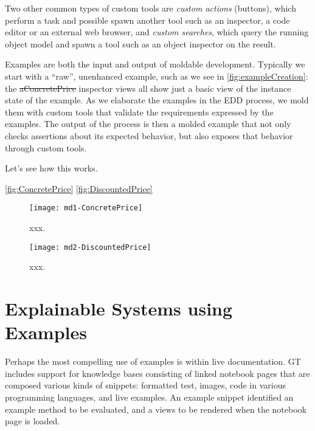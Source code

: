 \documentclass[sigplan,anonymous,review,10pt]{acmart}
\begin{document}
Two other common types of custom tools are \emph{custom actions} (\eg buttons), which perform a task and possible spawn another tool such as an inspector, a code editor or an external web browser, and \emph{custom searches}, which query the running object model and spawn a tool such as an object inspector on the result.

Examples are both the input and output of moldable development.
Typically we start with a ``raw'', unenhanced example, such as we see in \autoref{fig:exampleCreation}: the \st{aConcretePrice} inspector views all show just a basic view of the instance state of the example.
As we elaborate the examples in the EDD process, we mold them with custom tools that validate the requirements expressed by the examples.
The output of the process is then a molded example that not only checks assertions about its expected behavior, but also exposes that behavior through custom tools.

Let's see how this works.

\autoref{fig:ConcretePrice}
\autoref{fig:DiscountedPrice}


\begin{figure}[h]
  \texttt{[image: md1-ConcretePrice]}
  \caption{xxx.}
  \label{fig:ConcretePrice}
\end{figure}




\begin{figure}[h]
  \texttt{[image: md2-DiscountedPrice]}
  \caption{xxx.}
  \label{fig:DiscountedPrice}
\end{figure}





\section{Explainable Systems using Examples}\label{sec:explainable}


Perhaps the most compelling use of examples is within live documentation.
GT includes support for knowledge bases consisting of linked notebook pages that are composed various kinds of snippets: formatted test, images, code in various programming languages, and live examples.
An example snippet identified an example method to be evaluated, and a views to be rendered when the notebook page is loaded.
\end{document}
